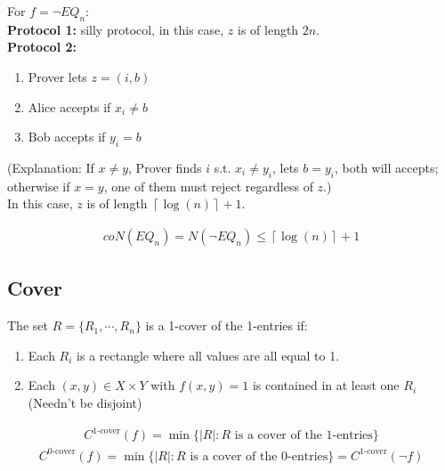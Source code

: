 \begin{eg}
    For $f = \neg EQ_n$:
    \\ \textbf{Protocol 1:} silly protocol, in this case, $z$ is of length $2n$.
    \\ \textbf{Protocol 2:} 
    \begin{enumerate}
        \item Prover lets $z = (i,b)$
        \item Alice accepts if $x_i \neq b$
        \item Bob accepts if $y_i = b$
    \end{enumerate}
    (Explanation: If $x \neq y$, Prover finds $i$ s.t. $x_i \neq y_i$, lets $b = y_i$, both will accepts; otherwise if $x = y$, one of them must reject regardless of $z$.)
    \\In this case, $z$ is of length $\left\lceil \log(n) \right\rceil + 1$.
\end{eg}
\begin{remark}
    \begin{align*}
        coN(EQ_n) = N(\neg EQ_n) \le \left\lceil \log(n) \right\rceil + 1
    \end{align*}
\end{remark}

\subsection{Cover} \label{sec:}

\begin{definition}[Cover]
    The set $R = \{ R_1,\cdots ,R_n \}$ is a 1-cover of the 1-entries if:
    \begin{enumerate}
        \item Each $R_i$ is a rectangle where all values are all equal to 1.
        \item Each $(x,y)\in X\times Y$ with $f(x,y)=1$ is contained in at least one $R_i$ (Needn't be disjoint)
    \end{enumerate}
\end{definition}

\begin{definition}
    \begin{align*}
        C^{\text{1-cover}}(f) = \min\{ |R| : R \text{ is a cover of the 1-entries} \}
    \end{align*}
    \begin{align*}
        C^{\text{0-cover}}(f) = \min\{ |R| : R \text{ is a cover of the 0-entries} \} = C^{\text{1-cover}}(\neg f)
    \end{align*}
\end{definition}

